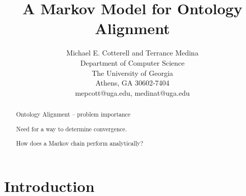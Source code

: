 \documentclass[letterpaper,twocolumn,12pt]{article}
\begin{document}
\newtheorem{defn}{Definition}

\title{A Markov Model for Ontology Alignment}

\author{Michael E. Cotterell and Terrance Medina \\
Department of Computer Science \\
The University of Georgia \\
Athens, GA 30602-7404 \\
mepcott@uga.edu, medinat@uga.edu
}

\maketitle

\begin{abstract}
Ontology Alignment -- problem importance

Need for a way to determine convergence.

How does a Markov chain perform analytically?

\end{abstract}


\section{Introduction}

\end{document}
